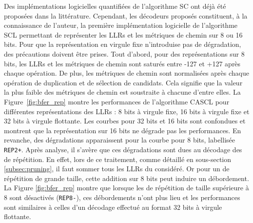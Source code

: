 Des implémentations logicielles quantifiées de l'algorithme SC ont déjà été proposées \cite{giard_low-latency_2016} dans la littérature.
 Cependant, les décodeurs proposés constituent, à la connaissance de l'auteur, la première implémentation logicielle de l'algorithme SCL permettant de représenter les LLRs et les métriques de chemin sur 8 ou 16 bits.
Pour que la représentation en virgule fixe n'introduise pas de dégradation, des précautions doivent être prises.
Tout d'abord, pour des représentations sur 8 bits, les LLRs et les métriques de chemin sont saturés entre -127 et +127 après chaque opération.
De plus, les métriques de chemin sont normalisées après chaque opération de duplication et de sélection de candidats. Cela signifie que la valeur la plus faible des métriques de chemin est soustraite à chacune d'entre elles.
La Figure~\ref{fig:bfer_rep} montre les performances de l'algorithme CASCL pour différentes représentations des LLRs : 8 bits à virgule fixe, 16 bits à virgule fixe et 32 bits à virgule flottante.
Les courbes pour 32 bits et 16 bits sont confondues et montrent que la représentation sur 16 bits ne dégrade pas les performances. En revanche, des dégradations apparaissent pour la courbe pour 8 bits, labellisée \texttt{REP2+}.
Après analyse, il s'avère que ces dégradations sont dues au décodage des \noeuds de répétition.
En effet, lors de ce traitement, comme détaillé en sous-section \ref{subsec:pruning}, il faut sommer tous les LLRs du \noeud considéré.
Or pour un \noeud de répétition de grande taille, cette addition sur 8 bits peut induire un débordement.
La Figure \ref{fig:bfer_rep} montre que lorsque les \noeuds de répétition de taille supérieure à 8 sont désactivés (\texttt{REP8-}), ces débordements n'ont plus lieu et les performances sont similaires à celles d'un décodage effectué au format 32 bits à virgule flottante.

